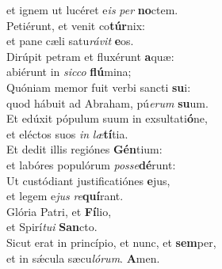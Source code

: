 \evenverse et ignem ut lucéret e\textit{is} \textit{per} \textbf{no}ctem.\\
\oddverse Petiérunt, et venit co\textbf{túr}nix:~\*\\
\oddverse et pane cæli satu\textit{rá}\textit{vit} \textbf{e}os.\\
\evenverse Dirúpit petram et fluxérunt \textbf{a}quæ:~\*\\
\evenverse abiérunt in \textit{sic}\textit{co} \textbf{flú}mina;\\
\oddverse Quóniam memor fuit verbi sancti \textbf{su}i:~\*\\
\oddverse quod hábuit ad Abraham, pú\textit{e}\textit{rum} \textbf{su}um.\\
\evenverse Et edúxit pópulum suum in exsultati\textbf{ó}ne,~\*\\
\evenverse et eléctos suos \textit{in} \textit{læ}\textbf{tí}tia.\\
\oddverse Et dedit illis regiónes \textbf{Gén}tium:~\*\\
\oddverse et labóres populórum \textit{pos}\textit{se}\textbf{dé}runt:\\
\evenverse Ut custódiant justificatiónes \textbf{e}jus,~\*\\
\evenverse et legem e\textit{jus} \textit{re}\textbf{quí}rant.\\
\oddverse Glória Patri, et \textbf{Fí}lio,~\*\\
\oddverse et Spirí\textit{tu}\textit{i} \textbf{San}cto.\\
\evenverse Sicut erat in princípio, et nunc, et \textbf{sem}per,~\*\\
\evenverse et in sǽcula sæcu\textit{ló}\textit{rum}. \textbf{A}men.\\
